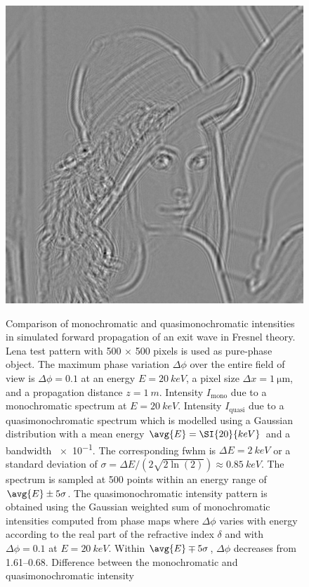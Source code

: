 \documentclass[
twoside,
openright,
titlepage,
numbers=noenddot,
headinclude,
fleqn,
a4paper,
footinclude=true,
cleardoublepage=empty,
abstractoff,
BCOR=5mm,
paper=a4,
fontsize=11pt,
british,ngerman,american,
]{scrreprt}
\begin{document}
\begin{figure}
{    \includegraphics*[width=.4\textwidth]
    {figures/QuasiInt/IntPoly.png}}\hfill
    \caption[Comparison of monochromatic and quasimonochromatic
    propagated intensities.]{Comparison of monochromatic and
      quasimonochromatic intensities in simulated forward propagation
      of an exit wave in Fresnel theory.  Lena test
      pattern with 500 $\times$ 500 pixels is used as pure-phase
      object.  The maximum phase variation $\Delta\phi$ over the
      entire field of view is $\Delta\phi= \num{0.1}$ at an energy
      $E=\SI{20}{keV}$, a pixel size $\Delta x = \SI{1}{\micro\metre}$,
      and a propagation distance $z=\SI{1}{m}$.  
      Intensity $I_{\mathrm{mono}}$ due to a monochromatic spectrum at
      $E=\SI{20}{keV}$.   Intensity $I_{\mathrm{quasi}}$
      due to a quasimonochromatic spectrum which is modelled using a
      Gaussian distribution with a mean energy $\avg{E}=\SI{20}{keV}$
      and a bandwidth \num{e-1}.  The corresponding \acf{fwhm} is
      $\Delta E=\SI{2}{keV}$ or a standard deviation of $\sigma =
      \Delta E/(2\sqrt{2\ln(2)})\approx\SI{0.85}{keV}$.  The spectrum
      is sampled at 500 points within an energy range of $\avg{E}\pm
      5\sigma$.  The quasimonochromatic intensity pattern is obtained
      using the Gaussian weighted sum of monochromatic intensities
      computed from phase maps where $\Delta\phi$ varies with energy
      according to the real part of the refractive index
      \cite{Henke1993} $\delta$ and with $\Delta\phi=0.1$ at
      $E=\SI{20}{keV}$.  Within $\avg{E}\mp 5\sigma$, $\Delta\phi$
      decreases from \numrange{1.61}{0.68}.   Difference
      between the monochromatic and quasimonochromatic intensity
}
\end{figure}
\end{document}
